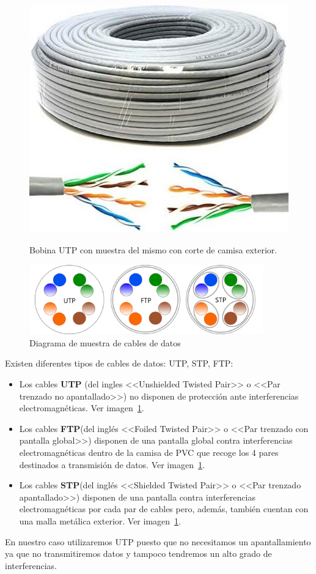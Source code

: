 \begin{figure}
    \centering
    \includegraphics[width=.4\textwidth]{img/bobina.jpg}
    \caption[Bobina UTP]{Bobina UTP con muestra del mismo con corte de camisa exterior.} \label{Img:Bobina UTP}
    \includegraphics[width=0.9\textwidth]{img/CABLES.png}
    \caption{Diagrama de muestra de cables de datos} \label{Img:CablesDatos}
\end{figure}

Existen diferentes tipos de cables de datos: UTP, STP, FTP:
\begin{itemize}
\item Los cables \textbf{UTP} (del ingles <<Unshielded Twisted Pair>> o <<Par trenzado no apantallado>>) no disponen de protección ante interferencias electromagnéticas. Ver imagen~\ref{Img:CablesDatos}.



\item Los cables \textbf{FTP}(del inglés <<Foiled Twisted Pair>> o <<Par trenzado con pantalla global>>) disponen de una pantalla global contra interferencias electromagnéticas dentro de la camisa de PVC que recoge los 4 pares destinados a transmisión de datos. Ver imagen~\ref{Img:CablesDatos}.



\item Los cables \textbf{STP}(del inglés <<Shielded Twisted Pair>> o <<Par trenzado apantallado>>) disponen de una pantalla contra interferencias electromagnéticas por cada par de cables pero, además, también cuentan con una malla metálica exterior. Ver imagen~\ref{Img:CablesDatos}.


\end{itemize}
En nuestro caso utilizaremos UTP puesto que no necesitamos un apantallamiento ya que no transmitiremos datos y tampoco tendremos un alto grado de interferencias.
